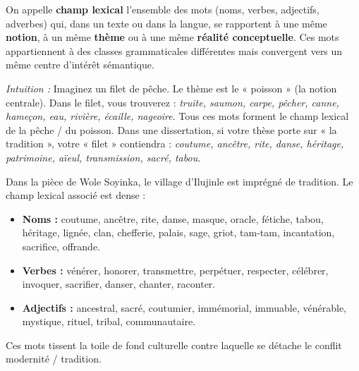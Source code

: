 \documentclass[11pt]{article}
\begin{document}
\begin{definition}
On appelle \textbf{champ lexical} l'ensemble des mots (noms, verbes, adjectifs, adverbes) qui, dans un texte ou dans la langue, se rapportent à une même \textbf{notion}, à un même \textbf{thème} ou à une même \textbf{réalité conceptuelle}. Ces mots appartiennent à des classes grammaticales différentes mais convergent vers un même centre d'intérêt sémantique.
\end{definition}

\emph{Intuition :} Imaginez un filet de pêche. Le thème est le « poisson » (la notion centrale). Dans le filet, vous trouverez : \emph{truite, saumon, carpe, pêcher, canne, hameçon, eau, rivière, écaille, nageoire}. Tous ces mots forment le champ lexical de la pêche / du poisson. Dans une dissertation, si votre thèse porte sur « la tradition », votre « filet » contiendra : \emph{coutume, ancêtre, rite, danse, héritage, patrimoine, aïeul, transmission, sacré, tabou}.

\begin{exemplebox}
Dans la pièce de Wole Soyinka, le village d'Ilujinle est imprégné de tradition. Le champ lexical associé est dense :
\begin{itemize}
    \item \textbf{Noms :} coutume, ancêtre, rite, danse, masque, oracle, fétiche, tabou, héritage, lignée, clan, chefferie, palais, sage, griot, tam-tam, incantation, sacrifice, offrande.
    \item \textbf{Verbes :} vénérer, honorer, transmettre, perpétuer, respecter, célébrer, invoquer, sacrifier, danser, chanter, raconter.
    \item \textbf{Adjectifs :} ancestral, sacré, coutumier, immémorial, immuable, vénérable, mystique, rituel, tribal, communautaire.
\end{itemize}
Ces mots tissent la toile de fond culturelle contre laquelle se détache le conflit modernité / tradition.
\end{exemplebox}
\end{document}
